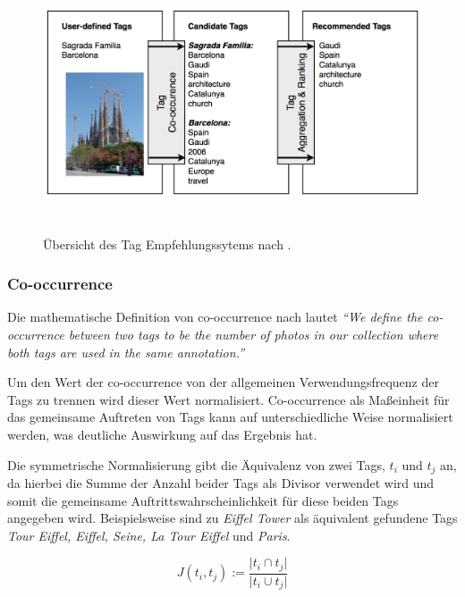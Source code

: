 \begin{figure}[htbp]
  \centering
    \includegraphics[height=3in]{images/collective_knowledge_system_overview.png}
  \caption{Übersicht des Tag Empfehlungssytems nach \cite{collectiveKnowledge}.}
  \label{fig:images_collective_knowledge_system_overview}
\end{figure}





\subsubsection{Co-occurrence} %
\label{ssub:co_occurrence}

Die mathematische Definition von co-occurrence nach \cite{collectiveKnowledge} lautet \emph{``We define the co-occurrence between two tags to be the number of photos in our collection where both tags are used in the same annotation.''} 
 
 
Um den Wert der co-occurrence von der allgemeinen Verwendungsfrequenz der Tags zu trennen wird dieser Wert normalisiert. Co-occurrence als Maßeinheit für das gemeinsame Auftreten von Tags kann auf unterschiedliche Weise normalisiert werden, was deutliche Auswirkung auf das Ergebnis hat.

Die symmetrische Normalisierung gibt die Äquivalenz von zwei Tags, ${t_i}$ und ${t_j}$ an, da hierbei die Summe der Anzahl beider Tags als Divisor verwendet wird und somit die gemeinsame Auftrittswahrscheinlichkeit für diese beiden Tags angegeben wird. Beispielsweise sind zu \emph{Eiffel Tower} als äquivalent gefundene Tags \emph{Tour Eiffel, Eiffel, Seine, La Tour Eiffel} und \emph{Paris}.
\begin{figure}[hptb]
  \begin{equation}
  \label{symmetricNormalization}
   J(t_i, t_j) := \frac{\vert t_i \cap t_j \vert}{ \vert t_i \cup t_j \vert }
  \end{equation}
\end{figure}

